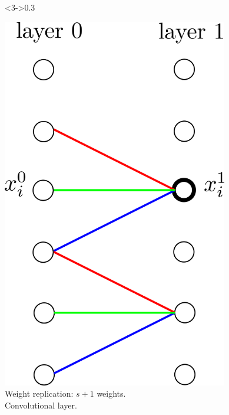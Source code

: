 \documentclass[xcolor=pdftex,dvipsnames,table,mathserif]{beamer}
\begin{document}
{\begin{columns}
    \begin{column}<3->{0.3\textwidth}
      \begin{center}
        \includegraphics[width=0.74\textwidth]{convolutional_layer.png}
        \\ \scriptsize{Weight replication: $s+1$ weights.\\
          \alert{Convolutional layer.}}
      \end{center}
    \end{column}

  \end{columns}

}
\end{document}

